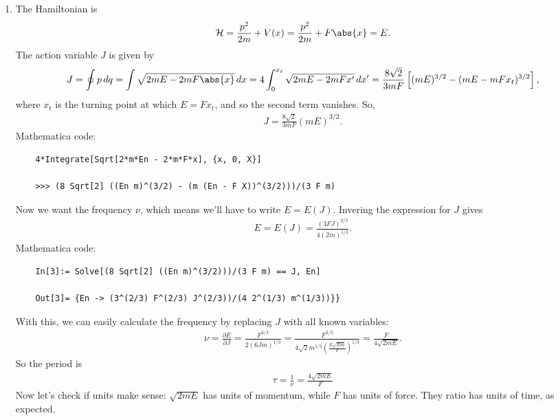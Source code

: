 \documentclass{article}
\theoremstyle{definition}
\newcommand{\p}{\partial}
\newcommand{\ham}{\mathcal{H}}
\newcommand{\f}[2]{\frac{#1}{#2}}
\newcommand{\lp}{\left(}
\newcommand{\rp}{\right)}
\newcommand{\lb}{\left[}
\newcommand{\rb}{\right]}
\begin{document}
\begin{enumerate}[label=(\alph*)]
	\item The Hamiltonian is 
	\begin{align*}
	\ham = \f{p^2}{2m} + V(x) = \f{p^2}{2m} + F\abs{x} = E.
	\end{align*}
	The action variable $J$ is given by 
	\begin{align*}
	J = \oint p\,dq = \int \sqrt{2mE - 2m F\abs{x}}\,dx = 4\int_0^{x_t} \sqrt{2mE - 2m F x'}\,dx' = \f{8\sqrt{2}}{3 m F}\lb (mE)^{3/2} - (mE - mFx_t)^{3/2}\rb,
	\end{align*}
	where $x_t$ is the turning point at which $E = F x_t$, and so the second term vanishes. So,
	\begin{align*}
	J = \f{8\sqrt{2}}{3mF}(mE)^{3/2}.
	\end{align*}
	Mathematica code:
	\begin{lstlisting}
	4*Integrate[Sqrt[2*m*En - 2*m*F*x], {x, 0, X}]
	
	>>> (8 Sqrt[2] ((En m)^(3/2) - (m (En - F X))^(3/2)))/(3 F m)
	\end{lstlisting}
	Now we want the frequency $\nu$, which means we'll have to write $E = E(J)$. Invering the expression for $J$ gives
	\begin{align*}
	E = E(J) = \f{(3FJ)^{2/3}}{4(2m)^{1/3}}.
	\end{align*}
	Mathematica code:
	\begin{lstlisting}
	In[3]:= Solve[(8 Sqrt[2] ((En m)^(3/2)))/(3 F m) == J, En]
	
	Out[3]= {En -> (3^(2/3) F^(2/3) J^(2/3))/(4 2^(1/3) m^(1/3))}}
	\end{lstlisting}
	With this, we can easily calculate the frequency by replacing $J$ with all known variables:
	\begin{align*}
	\nu = \f{\p E}{\p J} = \f{F^{2/3}}{2(6Jm)^{1/3}} = \f{F^{2/3}}{4\sqrt{2} m^{1/3}\lp \f{E\sqrt{Em} }{F} \rp^{1/3}} = \f{F}{4\sqrt{2m E} }.
	\end{align*}
	So the period is 
	\begin{align*}
	\boxed{\tau = \f{1}{\nu} = \f{4\sqrt{2mE}}{F}}
	\end{align*}
	Now let's check if units make sense: $\sqrt{2mE}$ has units of momentum, while $F$ has units of force. They ratio has units of time, as expected.
	

\end{enumerate}
\end{document}
